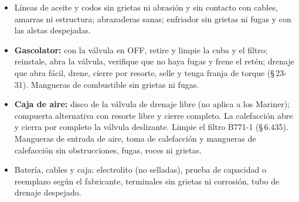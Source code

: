 \begin{itemize}
\item Líneas de aceite y codos sin grietas ni abrasión y sin contacto con cables, amarras ni estructura; abrazaderas sanas; enfriador sin grietas ni fugas y con las aletas despejadas.
\item \textbf{Gascolator:} con la válvula en OFF, retire y limpie la cuba y el filtro; reinstale, abra la válvula, verifique que no haya fugas y frene el retén; drenaje que abra fácil, drene, cierre por resorte, selle y tenga franja de torque (\S\,23-31). Mangueras de combustible sin grietas ni fugas.
\item \textbf{Caja de aire:} disco de la válvula de drenaje libre (no aplica a los Mariner); compuerta alternativa con resorte libre y cierre completo. La calefacción abre y cierra por completo la válvula deslizante. Limpie el filtro B771-1 (\S\,6.435). Mangueras de entrada de aire, toma de calefacción y mangueras de calefacción sin obstrucciones, fugas, roces ni grietas.
\item Batería, cables y caja: electrolito (no selladas), prueba de capacidad o reemplazo según el fabricante, terminales sin grietas ni corrosión, tubo de drenaje despejado.
\end{itemize}

